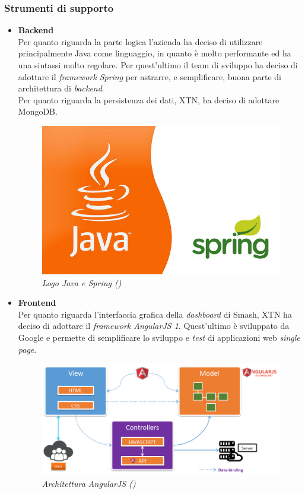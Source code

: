 \subsubsection{Strumenti di supporto}
\begin{itemize}
\item{\textbf{Backend}}\\
Per quanto riguarda la parte logica l'azienda ha deciso di utilizzare principalmente Java come linguaggio, in quanto è molto performante ed ha una sintassi molto regolare. Per quest'ultimo il team di sviluppo ha deciso di adottare il \textit{framework Spring} per astrarre, e semplificare, buona parte di architettura di \textit{backend}.\\
Per quanto riguarda la persistenza dei dati, XTN, ha deciso di adottare MongoDB.
\begin{figure}[ht]
	\centering
	\includegraphics[scale=0.15]{immagini/java-spring.png}
	\caption{\textit{Logo Java e Spring ()}}
\end{figure}
\item{\textbf{Frontend}}\\
Per quanto riguarda l'interfaccia grafica della \textit{dashboard} di Smash\textregistered, XTN ha deciso di adottare il \textit{framework AngularJS 1}. Quest'ultimo è sviluppato da Google e permette di semplificare lo sviluppo e \textit{test} di applicazioni web \textit{single page}.
\begin{figure}[ht]
	\centering
	\includegraphics[scale=0.3]{immagini/angular.png}
	\caption{\textit{Architettura AngularJS ()}}
\end{figure}
\end{itemize}

